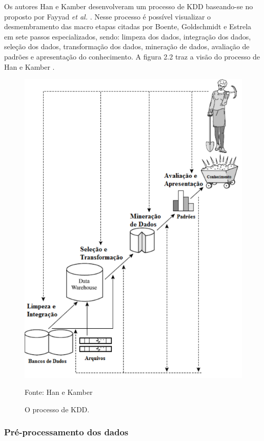 \documentclass[tg]{mdtufsm}
\begin{document}
Os autores Han e Kamber \citeyearpar{Han-kamber2nd} desenvolveram um processo de KDD baseando-se no proposto por Fayyad \textit{et al.} \citeyearpar{fayyad}. Nesse processo é possível visualizar o desmembramento das macro etapas citadas por Boente, Goldschmidt e Estrela \citeyearpar{Boente-Goldschmidt} em sete passos especializados, sendo: limpeza dos dados, integração dos dados, seleção dos dados, transformação dos dados, mineração de dados, avaliação de padrões e apresentação do conhecimento. A figura 2.2 traz a visão do processo de Han e Kamber \citeyearpar{Han-kamber2nd}.

\begin{figure}[!htb]
	\centering
	\includegraphics[scale=0.8]{images/HanKDD.png}
	\caption{O processo de KDD. } 
	\small{Fonte: Han e Kamber \citeyearpar{Han-kamber2nd}}
\end{figure}

\subsubsection{Pré-processamento dos dados}
\end{document}
